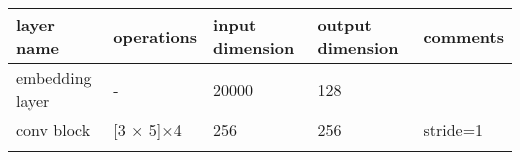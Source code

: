 \documentclass[]{article}
\begin{document}
\begin{longtable}[]{@{}lllll@{}}
\toprule
\begin{minipage}[b]{0.17\columnwidth}\raggedright
layer name\strut
\end{minipage} & \begin{minipage}[b]{0.17\columnwidth}\raggedright
operations\strut
\end{minipage} & \begin{minipage}[b]{0.17\columnwidth}\raggedright
input dimension\strut
\end{minipage} & \begin{minipage}[b]{0.17\columnwidth}\raggedright
output dimension\strut
\end{minipage} & \begin{minipage}[b]{0.17\columnwidth}\raggedright
comments\strut
\end{minipage}\tabularnewline
\midrule
\endhead
\begin{minipage}[t]{0.17\columnwidth}\raggedright
embedding layer\strut
\end{minipage} & \begin{minipage}[t]{0.17\columnwidth}\raggedright
-\strut
\end{minipage} & \begin{minipage}[t]{0.17\columnwidth}\raggedright
20000\strut
\end{minipage} & \begin{minipage}[t]{0.17\columnwidth}\raggedright
128\strut
\end{minipage} & \begin{minipage}[t]{0.17\columnwidth}\raggedright
\strut
\end{minipage}\tabularnewline
\begin{minipage}[t]{0.17\columnwidth}\raggedright
conv block\strut
\end{minipage} & \begin{minipage}[t]{0.17\columnwidth}\raggedright
{[}3 × 5{]}×4\strut
\end{minipage} & \begin{minipage}[t]{0.17\columnwidth}\raggedright
256\strut
\end{minipage} & \begin{minipage}[t]{0.17\columnwidth}\raggedright
256\strut
\end{minipage} & \begin{minipage}[t]{0.17\columnwidth}\raggedright
stride=1\strut
\end{minipage}\tabularnewline
\begin{minipage}[t]{0.17\columnwidth}\raggedright

\end{minipage}
\end{longtable}
\end{document}
